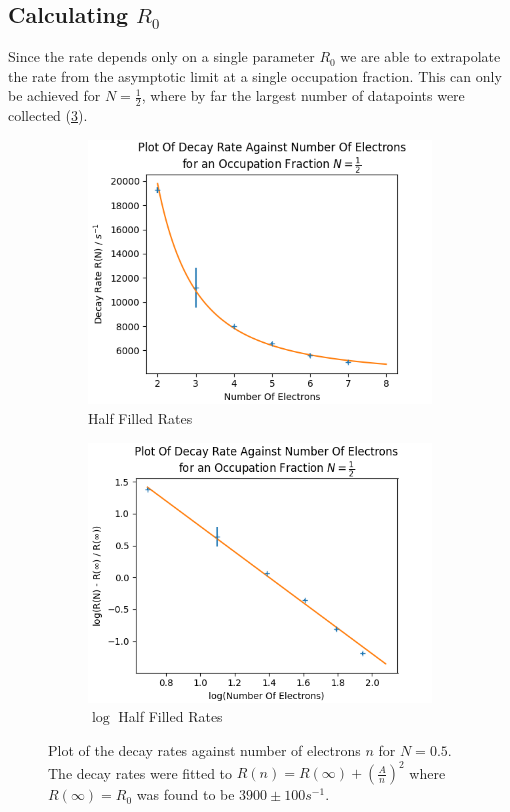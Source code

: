 \subsection{Calculating \(R_0\)}\label{sec:calculating R0}
Since the rate depends only on a single
parameter \(R_0\) we are able to
extrapolate the rate from
the asymptotic
limit at a single
occupation fraction. This can
only be achieved for
\(N=\frac{1}{2}\), where
by far the largest number of
datapoints were collected (\cref{fig:half filled rate}).
\begin{figure}[htbp]
    \centering
    \begin{subfigure}{0.45\linewidth}
        \centering
        \includegraphics[width =0.9 \linewidth]{Figures/Simulation/Decay rate against electrons N=0.5.png}
        \caption{Half Filled Rates
        }\label{sub@fig:plot of half filled rates}
    \end{subfigure}
    \hfill
    \begin{subfigure}{0.45\linewidth}
        \centering
        \includegraphics[width = 0.9\linewidth]{Figures/Simulation/Decay rate against electrons N=0.5 log.png}
        \caption{\(\log{}\) Half Filled Rates
        }\label{sub@fig:log plot of half fileld rates}
    \end{subfigure}
    \caption{Plot of the decay rates against
    number of electrons \(n\) for
    \(N=0.5\). The decay rates were
    fitted to
    \(R(n) = R(\infty) + {(\frac{A}{n})}^2\)
    where \(R(\infty) = R_0\) was
    found to be \(3900\pm 100s^{-1}\).
    }\label{fig:half filled rate}
\end{figure}
